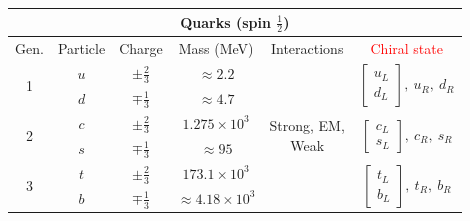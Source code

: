 \begin{table}[h!]
\begin{tabular}{c|c|c|c|c|c}
\multicolumn{6}{c}{Quarks (spin $\frac{1}{2}$)}\\ \hline
Gen.        & Particle & Charge & Mass (MeV) & Interactions & \textcolor{red}{Chiral state}\\ \hline
\multirow{2}{*}{1} & $u$  &  $\pm\frac{2}{3}$     & $\approx 2.2$     & \multirow{6}{*}{Strong, EM, \newline Weak} & \multirow{2}{*}{$\begin{bmatrix} u_L \\ d_{L}\end{bmatrix},\ u_{R},\ d_R$}\\
 & $d$      &	 $\mp\frac{1}{3}$ & $\approx4.7$  &       &	\\ \cline{1-4} \cline{6-6}
\multirow{2}{*}{2} & $c$  &  $\pm\frac{2}{3}$     & $1.275\times10^{3}$     &  & \multirow{2}{*}{$\begin{bmatrix} c_L \\ s_{L}\end{bmatrix},\ c_{R},\ s_R$}\\
 & $s$      &	 $\mp\frac{1}{3}$ & $\approx95$  &       &	\\ \cline{1-4} \cline{6-6}
\multirow{2}{*}{3} & $t$  &  $\pm\frac{2}{3}$     & $173.1\times10^{3}$     &  & \multirow{2}{*}{$\begin{bmatrix} t_L \\ b_{L}\end{bmatrix},\ t_{R},\ b_R$}\\
 & $b$      &	 $\mp\frac{1}{3}$ & $\approx4.18\times10^{3}$  &       &	\\ \hline
\end{tabular}
\end{table}


